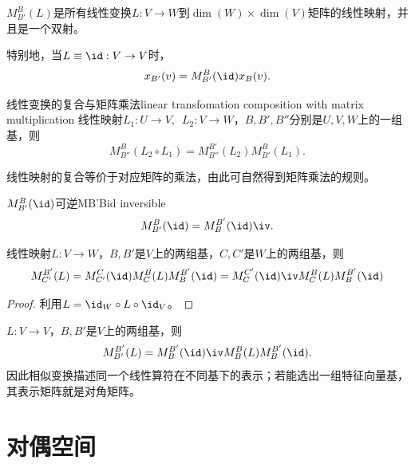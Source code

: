 \begin{corollary}
	$M_{B'}^B(L)$是所有线性变换$L:V\to W$到$\dim(W)\times\dim(V)$矩阵的线性映射，并且是一个双射。
\end{corollary}

\begin{corollary}
	特别地，当$L\equiv\id:V\to V$时， 
	\[
		x_{B'}(v)=M_{B'}^B(\id)x_B(v).
	\]
\end{corollary}

\begin{theorem}{线性变换的复合与矩阵乘法}{linear transfomation composition with matrix multiplication}
	线性映射$L_1:U\to V,\enspace L_2:V\to W$，$B,B',B''$分别是$U,V,W$上的一组基，则
	\[
		M_{B''}^B(L_2\circ L_1)=M_{B''}^{B'}(L_2)M_{B'}^B(L_1).
	\]
\end{theorem}
\noindent 线性映射的复合等价于对应矩阵的乘法，由此可自然得到矩阵乘法的规则。
\begin{theorem}{$M_{B'}^B(\id)$可逆}{MB'Bid inversible}
	\[
		M_{B'}^B(\id)=M_B^{B'}(\id)\iv.
	\]
\end{theorem}
\begin{theorem}{}{}
	线性映射$L:V\to W$，$B,B'$是$V$上的两组基，$C,C'$是$W$上的两组基，则
	\[
		M_{C'}^{B'}(L)=M_{C'}^C(\id)M_C^B(L)M_B^{B'}(\id)=M_C^{C'}(\id)\iv M_C^B(L)M_B^{B'}(\id)
	\]
\end{theorem}
\begin{proof}
	利用$L=\id_W\circ L\circ\id_V$。
\end{proof}
\begin{corollary}
	$L:V\to V$，$B,B'$是$V$上的两组基，则
	\[
		M_{B'}^{B'}(L)=M_B^{B'}(\id)\iv M_B^B(L)M_B^{B'}(\id).
	\]
	因此相似变换描述同一个线性算符在不同基下的表示；若能选出一组特征向量基，其表示矩阵就是对角矩阵。
\end{corollary}

\section{对偶空间}

